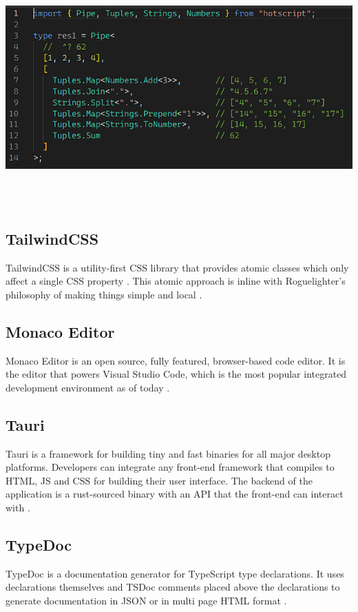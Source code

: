 \documentclass{article}
\begin{document}
\begin{minipage}{\linewidth}
    \centering
    \includegraphics[width=1\textwidth]{hotscript.PNG}
\end{minipage}\\\\

\subsection{TailwindCSS}
TailwindCSS is a utility-first CSS library that provides atomic classes which only affect a single CSS property . This atomic approach is inline with Roguelighter's philosophy of making things simple and local \cite{tailwindcss}.

\subsection{Monaco Editor}
Monaco Editor is an open source, fully featured, browser-based code editor. It is the editor that powers Visual Studio Code, which is the most popular integrated development environment as of today \cite{monaco-editor}\cite{developer-survey}.

\subsection{Tauri}
Tauri is a framework for building tiny and fast binaries for all major desktop platforms. Developers can integrate any front-end framework that compiles to HTML, JS and CSS for building their user interface. The backend of the application is a rust-sourced binary with an API that the front-end can interact with \cite{tauri}.

\subsection{TypeDoc}
TypeDoc is a documentation generator for TypeScript type declarations. It uses declarations themselves and TSDoc comments placed above the declarations to generate documentation in JSON or in multi page HTML format \cite{typedoc}.
\end{document}
